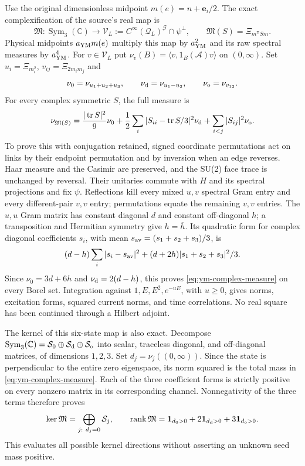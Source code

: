 Use the original dimensionless midpoint $m(e)=n+\mathbf e_i/2$.
The exact complexification of the source's real map is
\[
 \mathfrak M:\operatorname{Sym}_3(\mathbb C)\longrightarrow
 \mathscr V_L:=C^\infty(\mathcal Q_L)^{\mathcal G}\cap\psi^\perp,
 \qquad \mathfrak M(S)=\Xi_{m^{\mathsf T}Sm}.
\]
Physical midpoints $a_{\rm YM}m(e)$ multiply this map by
$a_{\rm YM}^2$ and its raw spectral measures by $a_{\rm YM}^4$.
For $v\in\mathscr V_L$ put
$\nu_v(B)=\langle v,1_B(\mathcal A)v\rangle$ on $(0,\infty)$.
Set $u_i=\Xi_{m_i^2}$, $v_{ij}=\Xi_{2m_im_j}$ and
\[
 \nu_0=\nu_{u_1+u_2+u_3},\qquad
 \nu_{\rm d}=\nu_{u_1-u_2},\qquad \nu_{\rm o}=\nu_{v_{12}}.
\]
For every complex symmetric $S$, the full measure is
\begin{equation}\label{eq:ym-complex-measure}
 \nu_{\mathfrak M(S)}
 =\frac{|\operatorname{tr}S|^2}{9}\nu_0
 +\frac12\sum_i|S_{ii}-\operatorname{tr}S/3|^2\nu_{\rm d}
 +\sum_{i<j}|S_{ij}|^2\nu_{\rm o}.
\end{equation}
To prove this with conjugation retained, signed coordinate
permutations act on links by their endpoint permutation and by
inversion when an edge reverses. Haar measure and the Casimir are
preserved, and the SU(2) face trace is unchanged by reversal.
Their unitaries commute with $H$ and its spectral projections and
fix $\psi$. Reflections kill every mixed $u,v$ spectral Gram entry
and every different-pair $v,v$ entry; permutations equate the
remaining $v,v$ entries. The $u,u$ Gram matrix has constant
diagonal $d$ and constant off-diagonal $h$; a transposition and
Hermitian symmetry give $h=\overline h$. Its quadratic form for
complex diagonal coefficients $s_i$, with mean
$s_{\rm av}=(s_1+s_2+s_3)/3$, is
\[
 (d-h)\sum_i|s_i-s_{\rm av}|^2
 +(d+2h)|s_1+s_2+s_3|^2/3 .
\]
Since $\nu_0=3d+6h$ and $\nu_{\rm d}=2(d-h)$, this proves
\eqref{eq:ym-complex-measure} on every Borel set. Integration
against $1,E,E^2,e^{-uE}$, with $u\ge0$, gives norms, excitation forms, squared
current norms, and time correlations. No real square has been
continued through a Hilbert adjoint.

The kernel of this six-state map is also exact. Decompose
$\operatorname{Sym}_3(\mathbb C)=\mathcal S_0\oplus
\mathcal S_{\rm d}\oplus\mathcal S_{\rm o}$ into scalar,
traceless diagonal, and off-diagonal matrices, of dimensions
$1,2,3$. Set $d_j=\nu_j((0,\infty))$. Since the state is
perpendicular to the entire zero eigenspace, its norm squared
is the total mass in \eqref{eq:ym-complex-measure}. Each of the
three coefficient forms is strictly positive on every nonzero
matrix in its corresponding channel. Nonnegativity of the
three terms therefore proves
\[
 \ker\mathfrak M=\bigoplus_{j:\ d_j=0}\mathcal S_j,\qquad
 \operatorname{rank}\mathfrak M
 =\mathbf1_{d_0>0}+2\mathbf1_{d_{\rm d}>0}
                         +3\mathbf1_{d_{\rm o}>0}.
\]
This evaluates all possible kernel directions without asserting
an unknown seed mass positive.

